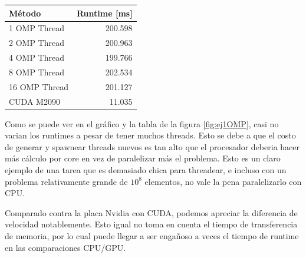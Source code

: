  \begin{table}[H]
    \begin{tabular}{l| r}
        \textbf{M\'etodo} & \textbf{ Runtime [ms] }\\ \hline
    1 OMP Thread         & 200.598      \\
    2 OMP Thread          & 200.963      \\
    4 OMP Thread          & 199.766      \\
    8 OMP Thread  & 202.534      \\
    16 OMP Thread & 201.127      \\
        CUDA M2090 & 11.035 
    \end{tabular}
\end{table}



 Como se puede ver en el gr\'afico y la tabla de la figura \ref{fig:ej1OMP}, casi no varian los runtimes a pesar de tener
 muchos threads. Esto se debe a que el costo de generar y spawnear threads nuevos es tan alto que el procesador
 deberia hacer m\'as c\'alculo por core en vez de paralelizar m\'as el problema. Esto es un claro ejemplo
 de una tarea que es demasiado chica para threadear, e incluso con un problema relativamente grande de $10^8$ 
 elementos, no vale la pena paralelizarlo con CPU.

 Comparado contra la placa Nvidia con CUDA, podemos apreciar la diferencia de velocidad notablemente. Esto igual no toma
 en cuenta el tiempo de transferencia de memoria, por lo cual puede llegar a ser enga\~noso a veces el tiempo de runtime
 en las comparaciones CPU/GPU.

